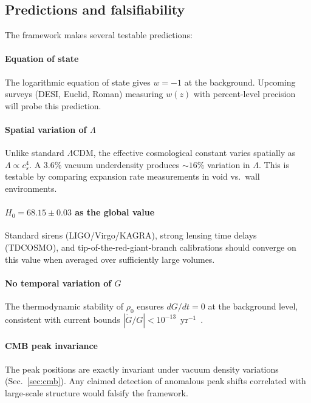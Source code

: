 \documentclass[12pt, a4paper]{article}
\begin{document}
\subsection{Predictions and falsifiability}

The framework makes several testable predictions:

\paragraph{Equation of state} The logarithmic equation of state gives $w = -1$ at the background. Upcoming surveys (DESI, Euclid, Roman) measuring $w(z)$ with percent-level precision will probe this prediction.

\paragraph{Spatial variation of $\Lambda$} Unlike standard $\Lambda$CDM, the effective cosmological constant varies spatially as $\Lambda \propto c_s^4$. A $3.6\%$ vacuum underdensity produces $\sim 16\%$ variation in $\Lambda$. This is testable by comparing expansion rate measurements in void vs.\ wall environments.

\paragraph{$H_0 = 68.15 \pm 0.03$ as the global value} Standard sirens (LIGO/Virgo/KAGRA), strong lensing time delays (TDCOSMO), and tip-of-the-red-giant-branch calibrations should converge on this value when averaged over sufficiently large volumes.

\paragraph{No temporal variation of $G$} The thermodynamic stability of $\rho_0$ ensures $dG/dt = 0$ at the background level, consistent with current bounds $|\dot{G}/G| < 10^{-13}$~yr$^{-1}$~\cite{will_2014}.

\paragraph{CMB peak invariance} The peak positions are exactly invariant under vacuum density variations (Sec.~\ref{sec:cmb}). Any claimed detection of anomalous peak shifts correlated with large-scale structure would falsify the framework.


\end{document}
